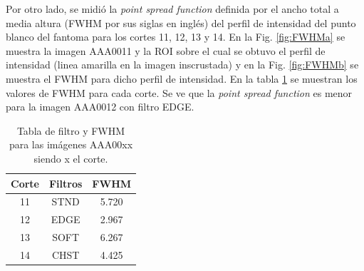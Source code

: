\documentclass[letterpaper,12pt]{article}
\theoremstyle{plain}
\begin{document}
Por otro lado, se midió la \textit{point spread function} definida por el ancho total a media altura (FWHM por sus siglas en inglés) del perfil de intensidad del punto blanco del fantoma para los cortes 11, 12, 13 y 14. En la Fig. \ref{fig:FWHMa} se muestra la imagen AAA0011 y la ROI sobre el cual se obtuvo el perfil de intensidad (linea amarilla en la imagen inscrustada) y en la Fig. \ref{fig:FWHMb} se muestra el FWHM para dicho perfil de intensidad. En la tabla \ref{tab:FWHM} se muestran los valores de FWHM para cada corte. Se ve que la \textit{point spread function} es menor para la imagen AAA0012 con filtro EDGE.

\begin{table}[H]
    \centering
    \begin{tabular}{c||c|c}
    \hline
    Corte & Filtros & FWHM  \\ \hline
    11 & STND    & 5.720   \\ \hline
    12 & EDGE    & 2.967   \\ \hline
    13 & SOFT    & 6.267   \\ \hline
    14 & CHST    & 4.425   \\ \hline
    \end{tabular}
    \caption{Tabla de filtro y FWHM para las imágenes AAA00xx siendo x el corte.} 
    \label{tab:FWHM}
\end{table}
\end{document}
